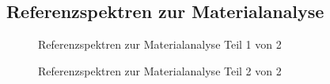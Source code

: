 \documentclass[11pt, a4paper]{article}
\begin{document}
\begin{appendix}
\section{Referenzspektren zur Materialanalyse}
\label{sec:referenzspektren}
\begin{figure}[!h]
\centering
\resizebox{\columnwidth}{!}{%
}
\caption{Referenzspektren zur Materialanalyse Teil 1 von 2}
\end{figure}

\begin{figure}[h]
\centering
\resizebox{\columnwidth}{!}{%
}
\caption{Referenzspektren zur Materialanalyse Teil 2 von 2}
\end{figure}
\end{appendix}
\end{document}
